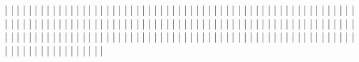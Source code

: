   |                      |
  |                      |
  |                      |
  |                      |
  |                      |
  |                      |
  |                      |
  |                      |
  |                      |
  |                      |
  |                      |
  |                      |
  |                      |
  |                      |
  |                      |
  |                      |
  |                      |
  |                      |
  |                      |
  |                      |
  |                      |
  |                      |
  |                      |
  |                      |
  |                      |
  |                      |
  |                      |
  |                      |
  |                      |
  |                      |
  |                      |
  |                      |
  |                      |
  |                      |
  |                      |
  |                      |
  |                      |
  |                      |
  |                      |
  |                      |
  |                      |
  |                      |
  |                      |
  |                      |
  |                      |
  |                      |
  |                      |
  |                      |
  |                      |
  |                      |
  |                      |
  |                      |
  |                      |
  |                      |
  |                      |
  |                      |
  |                      |
  |                      |
  |                      |
  |                      |
  |                      |
  |                      |
  |                      |
  |                      |
  |                      |
  |                      |
  |                      |
  |                      |
  |                      |
  |                      |
  |                      |
  |                      |
  |                      |
  |                      |
  |                      |
  |                      |
  |                      |
  |                      |
  |                      |
  |                      |
  |                      |
  |                      |
  |                      |
  |                      |
  |                      |
  |                      |
  |                      |
  |                      |
  |                      |
  |                      |
  |                      |
  |                      |
  |                      |
  |                      |
  |                      |
  |                      |
  |                      |
